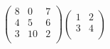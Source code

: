\documentclass[12pt]{article}
\begin{document}
$ \begin{equation*}    \begin{pmatrix}    8 & 0 & 7\\[0.3em]    4 & 5 & 6\\[0.3em]    3 & 10 & 2\\[0.3em]    \end{pmatrix}    \begin{pmatrix}    1 & 2\\[0.3em]    3 & 4\\[0.3em]    \end{pmatrix}    \end{equation*} $
\end{document}

